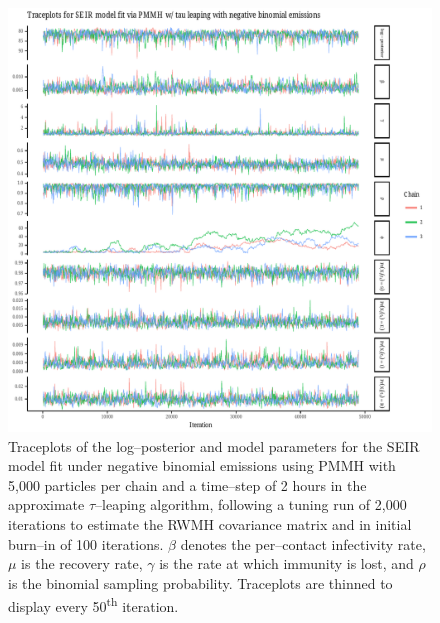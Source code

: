 \begin{figure}[htbp]
	\centering
	\includegraphics[width=\linewidth]{figures/bbs_seir_pmmh_negbinom_traceplots.pdf}
	\caption{Traceplots of the log--posterior and model parameters for the SEIR model fit under negative binomial emissions using PMMH with 5,000 particles per chain and a time--step of 2 hours in the approximate $ \tau $--leaping algorithm, following a tuning run of 2,000 iterations to estimate the RWMH covariance matrix and in initial burn--in of 100 iterations. $ \beta $ denotes the per--contact infectivity rate, $ \mu $ is the recovery rate, $ \gamma $ is the rate at which immunity is lost, and $ \rho $ is the binomial sampling probability. Traceplots are thinned to display every 50\textsuperscript{th} iteration.}
	\label{fig:bbs_seir_pmmh_negbinom_traceplots}
\end{figure}
